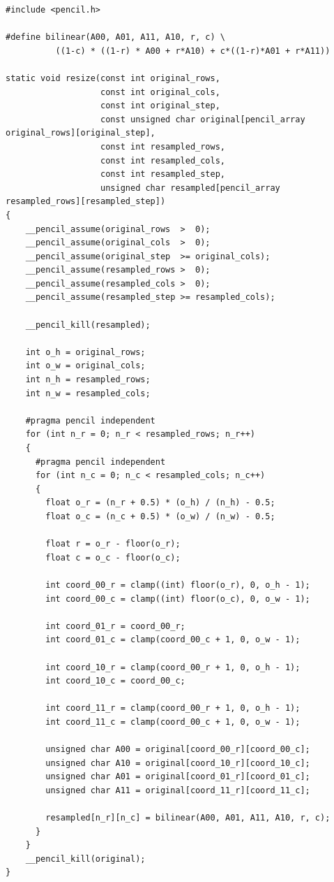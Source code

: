 \documentclass{carp}
\begin{document}
\begin{lstlisting}[language=pencil,escapechar=@]
#include <pencil.h>

#define bilinear(A00, A01, A11, A10, r, c) \
          ((1-c) * ((1-r) * A00 + r*A10) + c*((1-r)*A01 + r*A11))

static void resize(const int original_rows,
                   const int original_cols,
                   const int original_step,
                   const unsigned char original[pencil_array original_rows][original_step],
                   const int resampled_rows,
                   const int resampled_cols,
                   const int resampled_step,
                   unsigned char resampled[pencil_array resampled_rows][resampled_step])
{
    __pencil_assume(original_rows  >  0);
    __pencil_assume(original_cols  >  0);
    __pencil_assume(original_step  >= original_cols);
    __pencil_assume(resampled_rows >  0);
    __pencil_assume(resampled_cols >  0);
    __pencil_assume(resampled_step >= resampled_cols);

    __pencil_kill(resampled);

    int o_h = original_rows;
    int o_w = original_cols;
    int n_h = resampled_rows;
    int n_w = resampled_cols;

    #pragma pencil independent
    for (int n_r = 0; n_r < resampled_rows; n_r++)
    {
      #pragma pencil independent
      for (int n_c = 0; n_c < resampled_cols; n_c++)
      {
        float o_r = (n_r + 0.5) * (o_h) / (n_h) - 0.5;
        float o_c = (n_c + 0.5) * (o_w) / (n_w) - 0.5;

        float r = o_r - floor(o_r);
        float c = o_c - floor(o_c);

        int coord_00_r = clamp((int) floor(o_r), 0, o_h - 1);
        int coord_00_c = clamp((int) floor(o_c), 0, o_w - 1);

        int coord_01_r = coord_00_r;
        int coord_01_c = clamp(coord_00_c + 1, 0, o_w - 1);

        int coord_10_r = clamp(coord_00_r + 1, 0, o_h - 1);
        int coord_10_c = coord_00_c;

        int coord_11_r = clamp(coord_00_r + 1, 0, o_h - 1);
        int coord_11_c = clamp(coord_00_c + 1, 0, o_w - 1);

        unsigned char A00 = original[coord_00_r][coord_00_c];
        unsigned char A10 = original[coord_10_r][coord_10_c];
        unsigned char A01 = original[coord_01_r][coord_01_c];
        unsigned char A11 = original[coord_11_r][coord_11_c];

        resampled[n_r][n_c] = bilinear(A00, A01, A11, A10, r, c);
      }
    }
    __pencil_kill(original);
}
\end{lstlisting}
\end{document}
